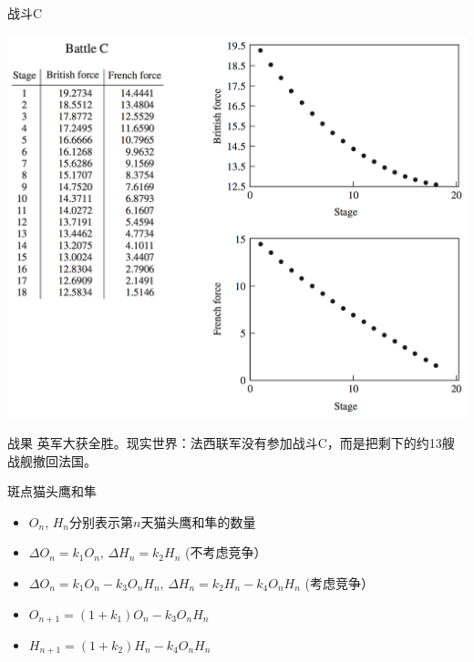 \documentclass[UTF8]{ctexbeamer}
\begin{document}
\begin{frame}{战斗C}
  \begin{center}
    \includegraphics[height=.9\textheight{}]{fight-C.png}
  \end{center}  
\end{frame}

\begin{frame}{战果}
  英军大获全胜。现实世界：法西联军没有参加战斗C，而是把剩下的约13艘战舰撤回法国。

\end{frame}

\begin{frame}{斑点猫头鹰和隼}
  \begin{itemize}
  \item<1-> $O_n$, $H_n$分别表示第$n$天猫头鹰和隼的数量
  \item<2-> $\Delta O_n=k_1O_n$, $\Delta H_n=k_2H_n$ (不考虑竞争）
  \item<3-> $\Delta O_n=k_1O_n - k_3O_nH_n$, $\Delta H_n=k_2H_n-k_4O_nH_n$ (考虑竞争）
  \item<4-> $O_{n+1}=(1+k_1)O_n - k_3O_nH_n$
  \item<4-> $H_{n+1}=(1+k_2)H_n-k_4O_nH_n$
  \end{itemize}
  
\end{frame}
\end{document}
